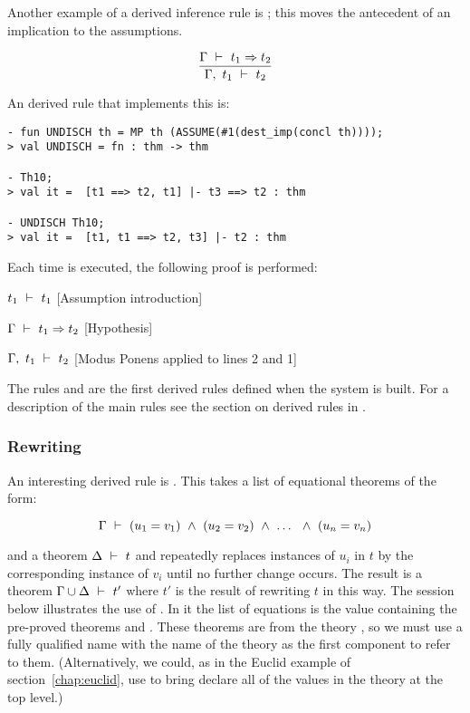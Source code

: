     Another example of a derived inference rule is ; this
    moves the antecedent of an implication to the assumptions.

\[ \frac{\Gamma\turn t_1\imp t_2}{\Gamma,\ t_1\turn t_2} \]

\noindent An \ML{} derived rule that implements this is:


\begin{session}\begin{verbatim}
- fun UNDISCH th = MP th (ASSUME(#1(dest_imp(concl th))));
> val UNDISCH = fn : thm -> thm

- Th10;
> val it =  [t1 ==> t2, t1] |- t3 ==> t2 : thm

- UNDISCH Th10;
> val it =  [t1, t1 ==> t2, t3] |- t2 : thm
\end{verbatim}\end{session}

\noindent Each time  is executed,
the following proof is performed:

\begin{proofenumerate}
\item $ t_1\ \vdash\  t_1$ \hfill [Assumption introduction]
\item $ \Gamma\ \vdash\  t_1\Rightarrow t_2$ \hfill [Hypothesis]
\item $ \Gamma,\ t_1\ \vdash\  t_2$ \hfill [Modus Ponens applied to lines 2 and 1]
\end{proofenumerate}

The rules  and  are the first derived rules
defined when the \HOL{} system is built. For a description of the main
rules see the section on derived rules in \DESCRIPTION.

\subsubsection{Rewriting}

An interesting derived rule is .  This takes a list of
equational theorems of the form:

\[ \Gamma\ \vdash\  (u_1 = v_1) \ \wedge\  (u_2 = v_2) \ \wedge\  \ldots\ \ \wedge\  (u_n  = v_n)\]

\noindent  and a theorem
$\Delta\ \vdash\  t$ and repeatedly replaces instances of $u_i$ in $t$ by
the corresponding instance of $v_i$ until no further change occurs.
The result is a theorem $\Gamma\cup\Delta\ \vdash\  t'$ where $t'$ is the
result of rewriting $t$ in this way.  The session below illustrates
the use of .  In it the list of equations is the
value  containing the pre-proved theorems
 and .  These theorems are from the
theory , so we must use a fully qualified name with the
name of the theory as the first component to refer to them.
(Alternatively, we could, as in the Euclid example of
section~\ref{chap:euclid}, use  to bring declare all of the
values in the theory at the top level.)

